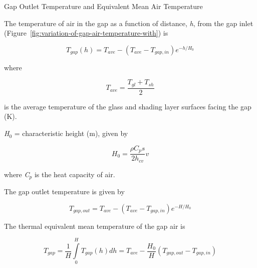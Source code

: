 Gap Outlet Temperature and Equivalent Mean Air Temperature

The temperature of air in the gap as a function of distance, \emph{h}, from the gap inlet (Figure~\ref{fig:variation-of-gap-air-temperature-with}) is

\begin{equation}
{T_{gap}}(h) = {T_{ave}} - ({T_{ave}} - {T_{gap,in}}){e^{ - h/{H_0}}}
\end{equation}

where

\begin{equation}
{T_{ave}} = \frac{{{T_{gl}} + {T_{sh}}}}{2}
\end{equation}

is the average temperature of the glass and shading layer surfaces facing the gap (K).

\emph{H\(_{0}\)} = characteristic height (m), given by

\begin{equation}
{H_0} = \frac{{\rho {C_p}s}}{{2{h_{cv}}}}v
\end{equation}

where \emph{C\(_{p}\)} is the heat capacity of air.

The gap outlet temperature is given by

\begin{equation}
{T_{gap,out}} = {T_{ave}} - ({T_{ave}} - {T_{gap,in}}){e^{ - H/{H_0}}}
\end{equation}

The thermal equivalent mean temperature of the gap air is

\begin{equation}
{T_{gap}} = \frac{1}{H}\int\limits_0^H {{T_{gap}}(h)dh = {T_{ave}} - \frac{{{H_0}}}{H}} \left( {{T_{gap,out}} - {T_{gap,in}}} \right)
\end{equation}

